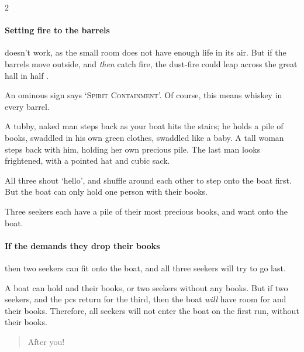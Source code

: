 \begin{multicols}{2}
\paragraph{Setting fire to the barrels}
doesn't work, as the small room does not have enough life in its air.
But if the barrels move outside, and \emph{then} catch fire, the dust-fire could leap across the great hall in half .


An ominous sign says `\textsc{Spirit Containment}'.
Of course, this means whiskey in every barrel.



\begin{boxtext}
  A tubby, naked man steps back as your boat hits the stairs; he holds a pile of books, swaddled in his own green clothes, swaddled like a baby.
  A tall woman steps back with him, holding her own precious pile.
  The last man looks frightened, with a pointed hat and cubic sack.

  All three shout `hello', and shuffle around each other to step onto the boat first.
  But the boat can only hold one person with their books.
\end{boxtext}

Three \glspl{seeker} each have a pile of their most precious books, and want onto the boat.

\paragraph{If the  demands they drop their books}
then two \glspl{seeker} can fit onto the boat, and all three \glspl{seeker} will try to go last.

A boat can hold  and their books, or two \glspl{seeker} without any books.
But if two \glspl{seeker}, and the \glspl{pc} return for the third, then the boat \emph{will} have room for  and their books.
Therefore, all \glspl{seeker} will not enter the boat on the first run, without their books.

\begin{quotation}
  After you!
  
  \vspace{-.4em}

  \vspace{-.3em}
\end{quotation}


\end{multicols}
